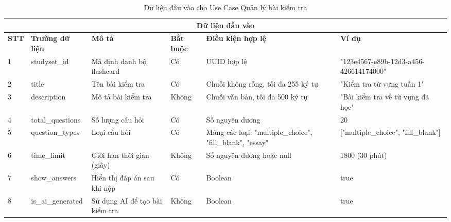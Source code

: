 \documentclass[../DoAn.tex]{subfiles}
\begin{document}
\begin{table}[h!]
\centering
\begin{tabular}{|m{1cm}|m{2.5cm}|m{3cm}|m{1cm}|m{2.5cm}|m{3.5cm}|}
    \hline
    \multicolumn{6}{|c|}{\textbf{Dữ liệu đầu vào}} \\
    \hline
    \textbf{STT} & \textbf{Trường dữ liệu} & \textbf{Mô tả} & \textbf{Bắt buộc} & \textbf{Điều kiện hợp lệ} & \textbf{Ví dụ} \\
    \hline
    1 & studyset\_id & Mã định danh bộ flashcard & Có & UUID hợp lệ & "123e4567-e89b-12d3-a456-426614174000" \\
    \hline
    2 & title & Tên bài kiểm tra & Có & Chuỗi không rỗng, tối đa 255 ký tự & "Kiểm tra từ vựng tuần 1" \\
    \hline
    3 & description & Mô tả bài kiểm tra & Không & Chuỗi văn bản, tối đa 500 ký tự & "Bài kiểm tra về từ vựng đã học" \\
    \hline
    4 & total\_questions & Số lượng câu hỏi & Có & Số nguyên dương & 20 \\
    \hline
    5 & question\_types & Loại câu hỏi & Có & Mảng các loại: "multiple\_choice", "fill\_blank", "essay" & ["multiple\_choice", "fill\_blank"] \\
    \hline
    6 & time\_limit & Giới hạn thời gian (giây) & Không & Số nguyên dương hoặc null & 1800 (30 phút) \\
    \hline
    7 & show\_answers & Hiển thị đáp án sau khi nộp & Có & Boolean & true \\
    \hline
    8 & is\_ai\_generated & Sử dụng AI để tạo bài kiểm tra & Không & Boolean & true \\
    \hline
\end{tabular}
\caption{Dữ liệu đầu vào cho Use Case Quản lý bài kiểm tra}
\end{table}

\vspace{0.5cm}
\end{document}
